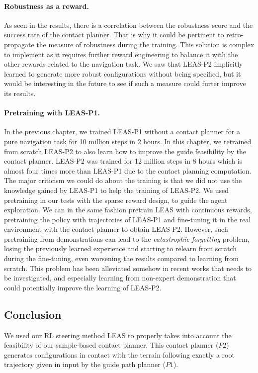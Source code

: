 \paragraph{Robustness as a reward.} 
As seen in the results, there is a correlation between the robustness score and the success rate of the contact planner. 
That is why it could be pertinent to retro-propagate the measure of robustness during the training.
This solution is complex to implement as it requires further reward engineering to balance it with the other rewards related to the navigation task. 
We saw that LEAS-P2 implicitly learned to generate more robust configurations without being specified, but it would be interesting in the future to see if such a measure could furter improve its results.

\paragraph{Pretraining with LEAS-P1.} 
In the previous chapter, we trained LEAS-P1 without a contact planner for a pure navigation task for 10 million steps in 2 hours. 
In this chapter, we retrained from scratch LEAS-P2 to also learn how to improve the guide feasibility by the contact planner. LEAS-P2 was trained for 12 million steps in 8 hours which is almost four times more than LEAS-P1 due to the contact planning computation. 
The major criticism we could do about the training is that we did not use the knowledge gained by LEAS-P1 to help the training of LEAS-P2.
We used pretraining in our tests with the sparse reward design, to guide the agent exploration.
We can in the same fashion pretrain LEAS with continuous rewards, pretraining the policy with trajectories of LEAS-P1 and fine-tuning it in the real environment with the contact planner to obtain LEAS-P2.
However, such pretraining from demonstrations can lead to the \textit{catastrophic forgetting} problem, losing the previously learned experience and starting to relearn from scratch during the fine-tuning, even worsening the results compared to learning from scratch.
This problem has been alleviated somehow in recent works \cite{DDPGfd,pretraining_BC} that needs to be investigated, and especially learning from non-expert demonstration \cite{learning_from_non_expert, meta_learning_from_demo} that could potentially improve the learning of LEAS-P2.

\subsection{Conclusion}
We used our RL steering method LEAS to properly takes into account the feasibility of our sample-based contact planner.
This contact planner ($P2$) generates configurations in contact with the terrain following exactly a root trajectory given in input by the guide path planner ($P1$).

